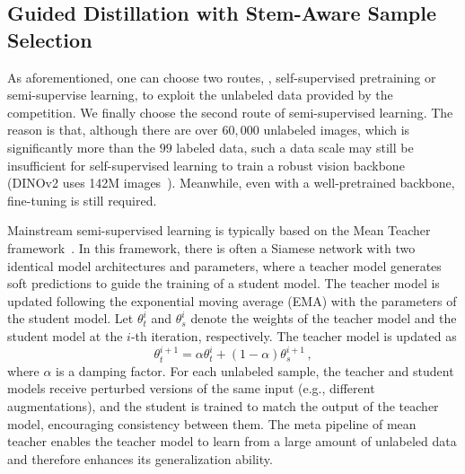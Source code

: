 \subsection{Guided Distillation with Stem-Aware Sample Selection}
As aforementioned, %
one can choose two routes, \ie, self-supervised pretraining or semi-supervise learning, to exploit the unlabeled data provided by the competition. We finally choose the second route of semi-supervised learning. The reason is that, although there are over $60,000$ unlabeled images, which is significantly more than the $99$ labeled data, such a data scale %
may still be insufficient for self-supervised learning to train a robust vision backbone (DINOv2 uses 142M images~\cite{oquab2023dinov2}). Meanwhile, even with a well-pretrained backbone, %
fine-tuning is still required. %
 

Mainstream semi-supervised learning is typically based on the Mean Teacher framework~\cite{tarvainen2017mean}. In %
this framework, there is often a Siamese network %
with two identical model architectures and parameters, where a teacher model generates soft predictions to guide the training of a student model. The teacher model is updated following the exponential moving average (EMA) with the parameters of the student model. %
Let $\theta_t^{i}$ and $\theta_s^{i}$ denote the weights of the teacher model and the student model at the $i$-th iteration, respectively. %
The teacher model is updated as %
\begin{equation}
    \theta_t^{i+1}=\alpha\theta_t^{i} + (1-\alpha)\theta_s^{i+1}\,,
\end{equation}
where $\alpha$ is a damping factor.
For each unlabeled sample, the teacher and student models receive perturbed versions of the same input (e.g., different augmentations), and the student is trained to match the output of the teacher model, %
encouraging consistency between them. The meta pipeline of mean teacher enables the teacher model to learn from a large amount of unlabeled data and therefore enhances its generalization ability.

